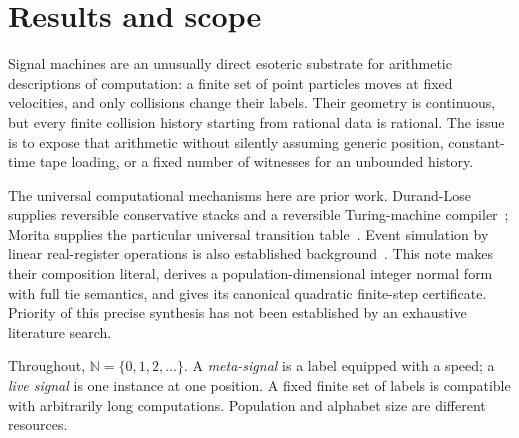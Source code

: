 \documentclass[11pt,letterpaper]{article}
\numberwithin{equation}{section}
\theoremstyle{definition}
\theoremstyle{remark}
\newcommand{\NN}{\mathbb N}
\begin{document}
\section{Results and scope}\label{smc:cs:sec:results}
Signal machines are an unusually direct esoteric substrate for arithmetic descriptions of computation: a finite set of point particles moves at fixed velocities, and only collisions change their labels. Their geometry is continuous, but every finite collision history starting from rational data is rational. The issue is to expose that arithmetic without silently assuming generic position, constant-time tape loading, or a fixed number of witnesses for an unbounded history.

The universal computational mechanisms here are prior work. Durand-Lose supplies reversible conservative stacks and a reversible Turing-machine compiler~\cite{dl2012}; Morita supplies the particular universal transition table~\cite{morita2008}. Event simulation by linear real-register operations is also established background~\cite{DL07}. This note makes their composition literal, derives a population-dimensional integer normal form with full tie semantics, and gives its canonical quadratic finite-step certificate. Priority of this precise synthesis has not been established by an exhaustive literature search.

Throughout, $\NN=\{0,1,2,\ldots\}$. A \emph{meta-signal} is a label equipped with a speed; a \emph{live signal} is one instance at one position. A fixed finite set of labels is compatible with arbitrarily long computations. Population and alphabet size are different resources.
\end{document}
